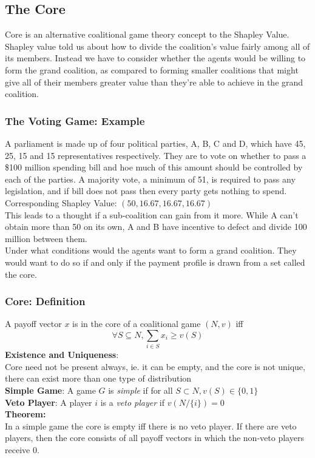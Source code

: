 \subsection{The Core}
Core is an alternative coalitional game theory concept to the Shapley Value. Shapley value told us about how to divide the coalition's value fairly among all of its members. Instead we have to consider whether the agents would be willing to form the grand coalition, as compared to forming smaller coalitions that might give all of their members greater value than they're able to achieve in the grand coalition.
\subsubsection{The Voting Game: Example}
A parliament is made up of four political parties, A, B, C and D, which have 45, 25, 15 and 15 representatives respectively. They are to vote on whether to pass a \$100 million spending bill and hoe much of this amount should be controlled by each of the parties. A majority vote, a minimum of 51, is required to pass any legislation, and if bill does not pass then every party gets nothing to spend.\\                                                                                                                                                                 
Corresponding Shapley Value: $(50, 16.67, 16.67, 16.67)$\\        
\newline                                                                      
This leads to a thought if a sub-coalition can gain from it more. While A can't obtain more than 50 on its own, A and B have incentive to defect and divide 100 million between them.\\
Under what conditions would the agents want to form a grand coalition. They would want to do so if and only if the payment profile is drawn from a set called the core.
\subsubsection{Core: Definition}
A payoff vector $x$ is in the core of a coalitional game $(N, v)$ iff $$\forall S \subseteq N, \sum_{i\in S} x_i \geq v(S)$$
\textbf{Existence and Uniqueness}:\\
Core need not be present always, ie. it can be empty, and the core is not unique, there can exist more than one type of distribution\\
\textbf{Simple Game}: A game $G$ is \textit{simple} if for all $S \subset N, v(S) \in \{0, 1\}$\\
\textbf{Veto Player}: A player $i$ is a \textit{veto player} if $v(N/ \{i\}) = 0$\\
\newline
\textbf{Theorem:}\\
In a simple game the core is empty iff there is no veto player. If there are veto players, then the core consists of all payoff vectors in which the non-veto players receive 0.

